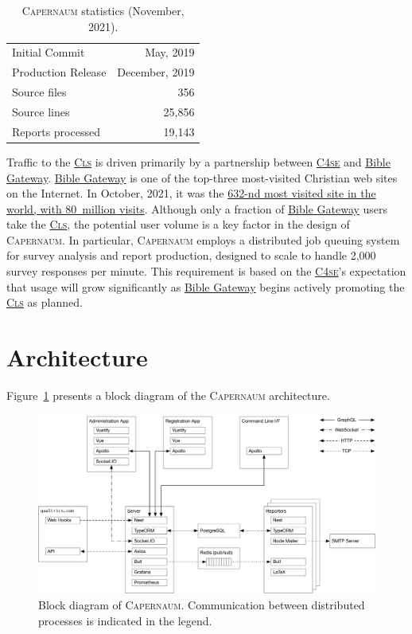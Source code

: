 \documentclass{article}
\newcommand{\caper}{\textsc{Capernaum}}
\newcommand{\bg}{\href{https://www.biblegateway.com/}{Bible Gateway}}
\newcommand{\cfse}{\href{https://www.taylor.edu/center-for-scripture-engagement/}{\textsc{C4se}}}
\newcommand{\cls}{\href{https://www.taylor.edu/center-for-scripture-engagement/survey/}{\textsc{Cls}}}
\begin{document}
\begin{table}
  \centering
  \begin{tabular}{lr}
    \toprule
    Initial Commit     & May, 2019      \\
    Production Release & December, 2019 \\
    \midrule
    Source files       & 356            \\
    Source lines       & 25,856         \\
    \midrule
    Reports processed  & 19,143         \\
    \bottomrule
  \end{tabular}
  \caption{\caper{} statistics (November, 2021).}
  \label{tab:caper-stats}
\end{table}

Traffic to the \cls{} is driven primarily by a partnership between \cfse{} and
\bg.
\bg{} is one of the top-three most-visited Christian web sites on the Internet.
In October, 2021, it was the
\href{https://www.similarweb.com/website/biblegateway.com/}{632-nd most visited site in the world,
  with 80~million visits}.
Although only a fraction of \bg{} users take the \cls,
the potential user volume is a key factor in the design of \caper.
In particular, \caper{} employs a distributed job queuing system
for survey analysis and report production,
designed to scale to handle 2,000 survey responses per minute.
This requirement is based on the \cfse{}'s
expectation that usage will grow significantly as \bg{}
begins actively promoting the \cls{} as planned.

\section{Architecture}
\label{sec:architecture}

Figure~\ref{fig:block-diagram}
presents a block diagram
of the \caper{} architecture.
\begin{figure}
  \centering
  \includegraphics[width=\textwidth]{block-diagram}
  \caption{Block diagram of \caper.
    Communication between distributed processes is indicated in the legend.}
  \label{fig:block-diagram}
\end{figure}
\end{document}
